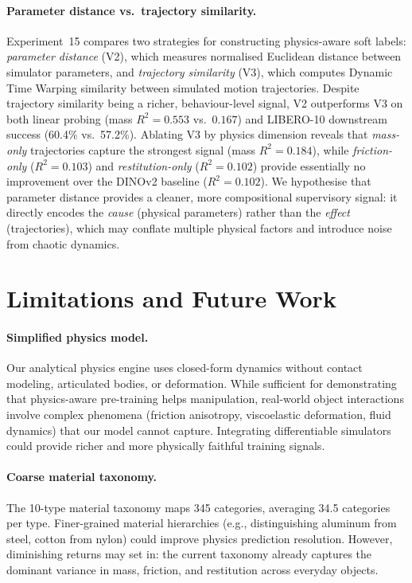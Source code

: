 \documentclass{article}
\begin{document}
\paragraph{Parameter distance vs.\ trajectory similarity.}
Experiment~15 compares two strategies for constructing physics-aware soft labels: \emph{parameter distance} (V2), which measures normalised Euclidean distance between simulator parameters, and \emph{trajectory similarity} (V3), which computes Dynamic Time Warping similarity between simulated motion trajectories. Despite trajectory similarity being a richer, behaviour-level signal, V2 outperforms V3 on both linear probing (mass $R^2{=}0.553$ vs.\ $0.167$) and LIBERO-10 downstream success (60.4\% vs.\ 57.2\%). Ablating V3 by physics dimension reveals that \emph{mass-only} trajectories capture the strongest signal (mass $R^2{=}0.184$), while \emph{friction-only} ($R^2{=}0.103$) and \emph{restitution-only} ($R^2{=}0.102$) provide essentially no improvement over the DINOv2 baseline ($R^2{=}0.102$). We hypothesise that parameter distance provides a cleaner, more compositional supervisory signal: it directly encodes the \emph{cause} (physical parameters) rather than the \emph{effect} (trajectories), which may conflate multiple physical factors and introduce noise from chaotic dynamics.


\section{Limitations and Future Work}
\label{sec:limitations}

\paragraph{Simplified physics model.} Our analytical physics engine uses closed-form dynamics without contact modeling, articulated bodies, or deformation. While sufficient for demonstrating that physics-aware pre-training helps manipulation, real-world object interactions involve complex phenomena (friction anisotropy, viscoelastic deformation, fluid dynamics) that our model cannot capture. Integrating differentiable simulators~\cite{toussaint2018differentiable} could provide richer and more physically faithful training signals.

\paragraph{Coarse material taxonomy.} The 10-type material taxonomy maps 345 categories, averaging 34.5 categories per type. Finer-grained material hierarchies (e.g., distinguishing aluminum from steel, cotton from nylon) could improve physics prediction resolution. However, diminishing returns may set in: the current taxonomy already captures the dominant variance in mass, friction, and restitution across everyday objects.
\end{document}
